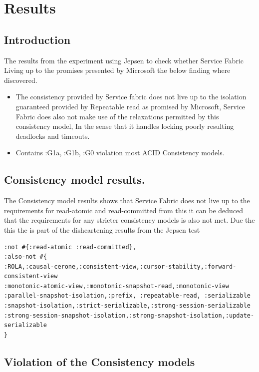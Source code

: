 \documentclass[a4paper,10pt,titlepage]{report}
\begin{document}
\newpage
\section{Results}

\subsection{Introduction}

The results from the experiment using Jepsen to check whether Service Fabric Living up to the promises presented by Microsoft the below finding where discovered. 
\begin{itemize}
    \item The consistency provided by Service fabric does not live up to the isolation guaranteed provided by Repeatable read as promised by Microsoft, Service Fabric does also not make use of the relaxations permitted by this consistency model, In the sense that it handles locking poorly resulting deadlocks and timeouts.
    \item Contains :G1a, :G1b, :G0 violation most ACID Consistency models.
\end{itemize}



\subsection{Consistency model results.}
The Consistency model results shows that Service Fabric does not live up to the requirements for read-atomic and read-committed from this it can be deduced that the requirements for any stricter consistency models is also not met. Due the this the is part of the disheartening results from the Jepsen test 
\begin{lstlisting}
:not #{:read-atomic :read-committed},
:also-not #{
:ROLA,:causal-cerone,:consistent-view,:cursor-stability,:forward-consistent-view
:monotonic-atomic-view,:monotonic-snapshot-read,:monotonic-view
:parallel-snapshot-isolation,:prefix, :repeatable-read, :serializable
:snapshot-isolation,:strict-serializable,:strong-session-serializable
:strong-session-snapshot-isolation,:strong-snapshot-isolation,:update-serializable
}
\end{lstlisting}

\newpage
\subsection{Violation of the Consistency models}
\end{document}
